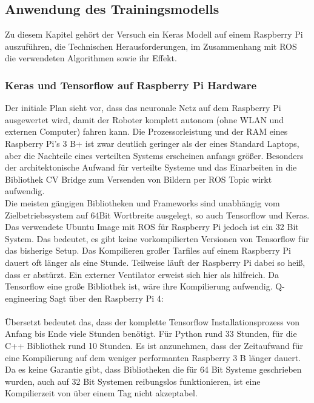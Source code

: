 \documentclass[conference]{IEEEtran}
\begin{document}
	
	\subsection{Anwendung des Trainingsmodells} %
	Zu diesem Kapitel gehört der Versuch ein Keras Modell auf einem 
	Raspberry Pi auszuführen, die Technischen Herausforderungen, im 
	Zusammenhang mit ROS  die verwendeten Algorithmen sowie ihr Effekt. 
	
	\subsubsection{Keras und Tensorflow auf Raspberry Pi Hardware}
	Der initiale Plan sieht vor, dass das neuronale Netz auf dem Raspberry Pi 
	ausgewertet wird, damit der Roboter komplett autonom (ohne WLAN und 
	externen Computer) fahren kann. Die Prozessorleistung und der RAM 
	eines Raspberry Pi's 3 B+ ist zwar deutlich geringer als der eines 
	Standard Laptops, aber die Nachteile eines verteilten Systems erscheinen 
	anfangs größer. Besonders der architektonische Aufwand für verteilte 
	Systeme und das Einarbeiten in die Bibliothek CV Bridge zum Versenden 
	von Bildern per ROS Topic wirkt aufwendig. \\
	Die meisten gängigen Bibliotheken und Frameworks sind unabhängig vom 
	Zielbetriebssystem auf 64Bit Wortbreite ausgelegt, so auch Tensorflow 
	und Keras. Das verwendete Ubuntu Image mit ROS für Raspberry Pi 
	jedoch ist ein 32 Bit System. Das bedeutet, es gibt keine vorkompilierten 
	Versionen von Tensorflow für das bisherige Setup. Das Kompilieren 
	großer Tarfiles auf einem Raspberry Pi dauert oft länger als eine Stunde. 
	Teilweise läuft der Raspberry Pi dabei so heiß, dass er abstürzt. Ein 
	externer Ventilator erweist sich hier als hilfreich. Da Tensorflow eine große 
	Bibliothek ist, wäre ihre Kompilierung aufwendig.
Q-engineering	\cite{qengineering}
	Sagt über den Raspberry Pi 4: \\
	 \\
	Übersetzt bedeutet das, dass der komplette Tensorflow Installationsprozess von Anfang bis Ende viele Stunden benötigt. Für Python rund 33 Stunden, für die C++ 
	Bibliothek rund 10 Stunden.
	Es ist anzunehmen, dass der Zeitaufwand für eine Kompilierung auf dem 
	weniger performanten Raspberry 3 B länger dauert. Da es keine Garantie 
	gibt, dass Bibliotheken die für 64 Bit Systeme geschrieben wurden, auch 
	auf 32 Bit Systemen reibungslos funktionieren, ist eine Kompilierzeit 
	von über einem Tag nicht akzeptabel. \\
	
\end{document}
